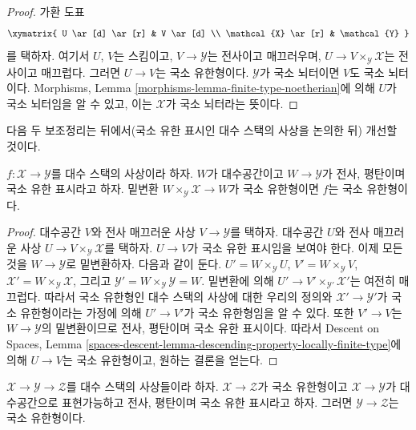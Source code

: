 \begin{proof}
가환 도표
$$
\xymatrix{
U \ar[d] \ar[r] & V \ar[d] \\
\mathcal{X} \ar[r] & \mathcal{Y}
}
$$
를 택하자. 여기서 $U$, $V$는 스킴이고, $V \to \mathcal{Y}$는 전사이고
매끄러우며, $U \to V \times_\mathcal{Y} \mathcal{X}$는 전사이고
매끄럽다. 그러면 $U \to V$는 국소 유한형이다. $\mathcal{Y}$가
국소 뇌터이면 $V$도 국소 뇌터이다. Morphisms, Lemma
\ref{morphisms-lemma-finite-type-noetherian}에 의해 $U$가 국소 뇌터임을
알 수 있고, 이는 $\mathcal{X}$가 국소 뇌터라는 뜻이다.
\end{proof}

\noindent
다음 두 보조정리는 뒤에서(국소 유한 표시인 대수 스택의 사상을 논의한 뒤)
개선할 것이다.

\begin{lemma}
\label{lemma-check-finite-type-covering}
$f : \mathcal{X} \to \mathcal{Y}$를 대수 스택의 사상이라 하자.
$W$가 대수공간이고 $W \to \mathcal{Y}$가 전사, 평탄이며 국소 유한
표시라고 하자. 밑변환 $W \times_\mathcal{Y} \mathcal{X} \to W$가
국소 유한형이면 $f$는 국소 유한형이다.
\end{lemma}

\begin{proof}
대수공간 $V$와 전사 매끄러운 사상 $V \to \mathcal{Y}$를 택하자.
대수공간 $U$와 전사 매끄러운 사상
$U \to V \times_\mathcal{Y} \mathcal{X}$를 택하자.
$U \to V$가 국소 유한 표시임을 보여야 한다.%
이제 모든 것을 $W \to \mathcal{Y}$로 밑변환하자. 다음과 같이 둔다.
$U' = W \times_\mathcal{Y} U$,
$V' = W \times_\mathcal{Y} V$,
$\mathcal{X}' = W \times_\mathcal{Y} \mathcal{X}$,
그리고 $\mathcal{Y}' = W \times_\mathcal{Y} \mathcal{Y} = W$.
밑변환에 의해 $U' \to V' \times_{\mathcal{Y}'} \mathcal{X}'$는 여전히
매끄럽다. 따라서 국소 유한형인 대수 스택의 사상에 대한 우리의 정의와
$\mathcal{X}' \to \mathcal{Y}'$가 국소 유한형이라는 가정에 의해
$U' \to V'$가 국소 유한형임을 알 수 있다. 또한 $V' \to V$는
$W \to \mathcal{Y}$의 밑변환이므로 전사, 평탄이며 국소 유한 표시이다.
따라서 Descent on Spaces, Lemma
\ref{spaces-descent-lemma-descending-property-locally-finite-type}에 의해
$U \to V$는 국소 유한형이고, 원하는 결론을 얻는다.
\end{proof}

\begin{lemma}
\label{lemma-check-finite-type-precompose}
$\mathcal{X} \to \mathcal{Y} \to \mathcal{Z}$를 대수 스택의 사상들이라
하자. $\mathcal{X} \to \mathcal{Z}$가 국소 유한형이고
$\mathcal{X} \to \mathcal{Y}$가 대수공간으로 표현가능하고 전사, 평탄이며
국소 유한 표시라고 하자. 그러면 $\mathcal{Y} \to \mathcal{Z}$는
국소 유한형이다.
\end{lemma}

